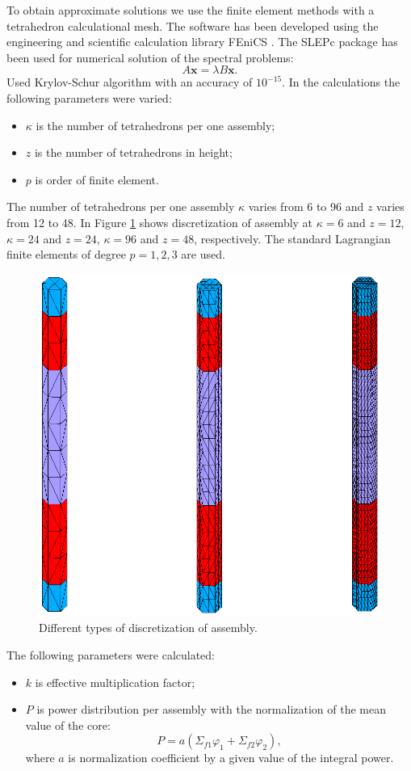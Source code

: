 \documentclass[runningheads,a4paper]{llncs}
\begin{document}
To obtain approximate solutions we use the finite element methods \cite{brenner} 
with a tetrahedron calculational mesh. The software has been developed using the engineering and scientific calculation library FEniCS \cite{logg2012automated}. The SLEPc package \cite{slepc} has been used for numerical solution of the spectral problems:
\begin{equation}\label{8}
A\bm{x} = \lambda B \bm{x}.
\end{equation}
Used Krylov-Schur algorithm with an accuracy of $10^{-15}$. In the calculations the following parameters were varied:
\begin{itemize}\itemsep1pt \parskip0pt 
\item $\kappa$ is the number of tetrahedrons per one assembly; 
\item $z$ is the number of tetrahedrons in height; 
\item $p$ is order of finite element.
\end{itemize}
The number of tetrahedrons per one assembly $\kappa$  varies from 6 to 96 and $z$ varies from 12 to 48. In Figure \ref{fig:2} shows discretization of assembly at $\kappa=6$ and $z=12$, $\kappa=24$ and $z=24$, $\kappa=96$ and $z=48$, respectively. The standard Lagrangian finite elements of degree $p=1,2,3$ are used.

\begin{figure}[htp]
  \begin{center}
    \includegraphics[width=0.65\linewidth] {3.png}
	\caption{Different types of discretization of assembly.}
	\label{fig:2}
  \end{center}
\end{figure}

The following parameters were calculated:
\begin{itemize}\itemsep1pt \parskip0pt 
\item $k$ is effective multiplication factor;
\item $P$ is power distribution  per assembly with the normalization of the mean value of the core:
\begin{equation}\label{9}
P = a(\Sigma_{f1} \varphi_1 + \Sigma_{f2} \varphi_2),
\end{equation}
where $a$ is normalization coefficient by a given value of the integral power.
\end{itemize}
\end{document}
